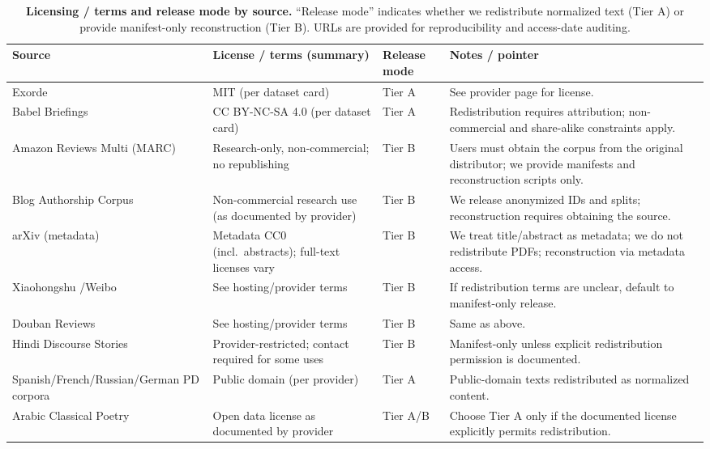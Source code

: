 \documentclass{article}
\begin{document}
\begin{table}[t]
\small
\setlength{\tabcolsep}{6pt}
\renewcommand{\arraystretch}{1.25}
\centering
\caption{\textbf{Licensing / terms and release mode by source.} “Release mode” indicates whether we redistribute normalized text (Tier A) or provide manifest-only reconstruction (Tier B). URLs are provided for reproducibility and access-date auditing.}
\label{app:license-table}

\begin{tabularx}{\textwidth}{@{}
  >{\RaggedRight\arraybackslash}p{3.4cm}
  >{\RaggedRight\arraybackslash}X
  >{\centering\arraybackslash}p{1.6cm}
  >{\RaggedRight\arraybackslash}X
@{}}
\toprule
\textbf{Source} & \textbf{License / terms (summary)} & \textbf{Release mode} & \textbf{Notes / pointer} \\
\midrule
Exorde & MIT (per dataset card) & Tier A & See provider page for license. \\\addlinespace[2pt]
Babel Briefings & CC BY-NC-SA 4.0 (per dataset card) & Tier A & Redistribution requires attribution; non-commercial and share-alike constraints apply. \\\addlinespace[2pt]
Amazon Reviews Multi (MARC) & Research-only, non-commercial; no republishing & Tier B & Users must obtain the corpus from the original distributor; we provide manifests and reconstruction scripts only. \\\addlinespace[2pt]
Blog Authorship Corpus & Non-commercial research use (as documented by provider) & Tier B & We release anonymized IDs and splits; reconstruction requires obtaining the source. \\\addlinespace[2pt]
arXiv (metadata) & Metadata CC0 (incl.\ abstracts); full-text licenses vary & Tier B & We treat title/abstract as metadata; we do not redistribute PDFs; reconstruction via metadata access. \\\addlinespace[2pt]
Xiaohongshu \slash Weibo & See hosting/provider terms & Tier B & If redistribution terms are unclear, default to manifest-only release. \\\addlinespace[2pt]
Douban Reviews & See hosting/provider terms & Tier B & Same as above. \\\addlinespace[2pt]
Hindi Discourse Stories & Provider-restricted; contact required for some uses & Tier B & Manifest-only unless explicit redistribution permission is documented. \\\addlinespace[2pt]
Spanish\slash French\slash Russian\slash German PD corpora & Public domain (per provider) & Tier A & Public-domain texts redistributed as normalized content. \\\addlinespace[2pt]
Arabic Classical Poetry & Open data license as documented by provider & Tier A/B & Choose Tier A only if the documented license explicitly permits redistribution. \\
\bottomrule
\end{tabularx}

\vspace{2mm}
\end{table}
\end{document}
